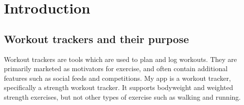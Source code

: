 \documentclass{l4proj}
\begin{document}
\def\consentname {Eerik Saksi} %
\def\consentdate {31 March 2021} %

\educationalconsent


\tableofcontents

%
%
%
%
%
%
%
%
\chapter{Introduction}

\section{Workout trackers and their purpose}
Workout trackers are tools which are used to plan and log workouts. They are primarily marketed as motivators for exercise, and often contain additional features such as social feeds and competitions. My app is a workout tracker, specifically a strength workout tracker. It supports bodyweight and weighted strength exercises, but not other types of exercise such as walking and running. 
\end{document}
